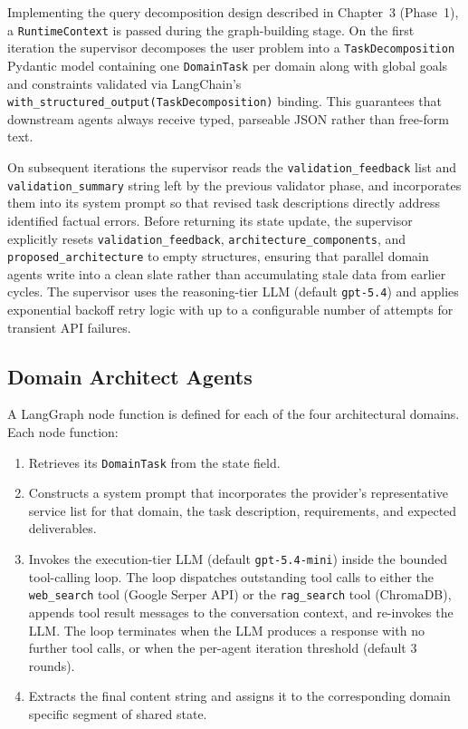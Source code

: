 Implementing the query decomposition design described in Chapter~3 (Phase~1), a \texttt{RuntimeContext} is passed during the graph-building stage. On the first iteration the supervisor decomposes the user problem into a \texttt{TaskDecomposition} Pydantic model containing one \texttt{DomainTask} per domain along with global goals and constraints validated via LangChain's \texttt{with\_structured\_output(TaskDecomposition)} binding. This guarantees that downstream agents always receive typed, parseable JSON rather than free-form text.

On subsequent iterations the supervisor reads the \texttt{validation\_feedback} list and \texttt{validation\_summary} string left by the previous validator phase, and incorporates them into its system prompt so that revised task descriptions directly address identified factual errors. Before returning its state update, the supervisor explicitly resets \texttt{validation\_feedback}, \texttt{architecture\_components}, and \texttt{proposed\_architecture} to empty structures, ensuring that parallel domain agents write into a clean slate rather than accumulating stale data from earlier cycles. The supervisor uses the reasoning-tier LLM (default \texttt{gpt-5.4}) and applies exponential backoff retry logic with up to a configurable number of attempts for transient API failures.

\subsection{Domain Architect Agents}

A LangGraph node function is defined for each of the four architectural domains. Each node function:

\begin{enumerate}
    \item Retrieves its \texttt{DomainTask} from the state field.
    \item Constructs a system prompt that incorporates the provider's representative service list for that domain, the task description, requirements, and expected deliverables.
    \item Invokes the execution-tier LLM (default \texttt{gpt-5.4-mini}) inside the bounded tool-calling loop. The loop dispatches outstanding tool calls to either the \texttt{web\_search} tool (Google Serper API) or the \texttt{rag\_search} tool (ChromaDB), appends tool result messages to the conversation context, and re-invokes the LLM. The loop terminates when the LLM produces a response with no further tool calls, or when the per-agent iteration threshold (default 3 rounds).
    \item Extracts the final content string and assigns it to the corresponding domain specific segment of shared state.
\end{enumerate}


